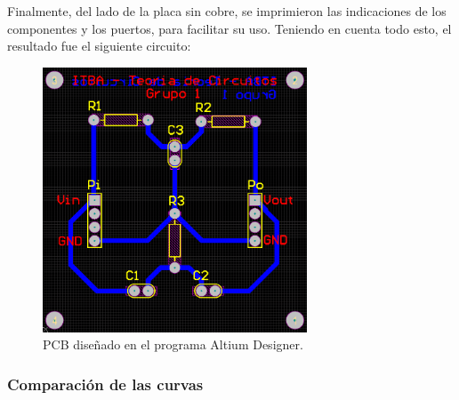 Finalmente, del lado de la placa sin cobre, se imprimieron las indicaciones de los componentes y los puertos, para facilitar su uso.
Teniendo en cuenta todo esto, el resultado fue el siguiente circuito:
\begin{figure}[h]
    \centering
    \begin{minipage}{\textwidth}
        \centering
        \includegraphics[width=0.7\textwidth]{./EJ1/PCB.png}
        \caption{PCB dise\~nado en el programa Altium Designer.}
        \label{fig: PCB_Altium}
    \end{minipage}\hfill
\end{figure}




\subsubsection{Comparaci\'on de las curvas}

